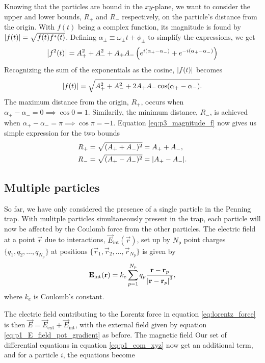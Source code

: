 Knowing that the particles are bound in the $xy$-plane, we want to consider the upper and lower bounds, $R_+$ and $R_-$ respectively, on the particle's distance from the origin. With $f(t)$ being a complex function, its magnitude is found by $\abs{f(t)}=\sqrt{f(t)f^*(t)}$. Defining $\alpha_\pm \equiv \omega_\pm t + \phi_\pm$ to simplify the expressions, we get 
\begin{equation}\label{eq:p3_magnitude_f_squared}
        \abs{f^2(t)} = A_+^2 + A_-^2 + A_+ A_- \left( e^{i(\alpha_+ - \alpha_-)} + e^{-i(\alpha_+ - \alpha_-)} \right)
\end{equation}
Recognizing the sum of the exponentials as the cosine, $\abs{f(t)}$ becomes 
\begin{equation}\label{eq:p3_magnitude_f}
    \abs{f(t)} = \sqrt{A_+^2 + A_-^2 + 2A_+ A_-\cos(\alpha_+ - \alpha_-)}.
\end{equation}
The maximum distance from the origin, $R_+$, occurs when $\alpha_+-\alpha_- = 0 \implies \cos0=1$. Similarily, the minimum distance, $R_-$, is achieved when $\alpha_+-\alpha_- = \pi \implies \cos\pi=-1$. Equation \eqref{eq:p3_magnitude_f} now gives us simple expression for the two bounds  
\begin{align}
    R_+ &= \sqrt{(A_+ + A_-)^2} = A_+ + A_-, \label{eq:p4_Rplus} \\
    R_- &= \sqrt{(A_+ - A_-)^2} = \abs{A_+ - A_-}. \label{eq:p4_Rminus}  
\end{align}


\subsection{Multiple particles}\label{subsec_methods:multiple_particles}
So far, we have only considered the presence of a single particle in the Penning trap. With mulitple particles simultaneously present in the trap, each particle will now be affected by the Coulomb force from the other particles. The electric field at a point $\vec{r}$ due to interactions, $\vec{E}_\mathrm{int}(\vec{r})$, set up by $N_\mathrm{p}$ point charges $\{q_1, q_2, \dots, q_{N_\mathrm{p}}\}$ at positions $\{\vec{r}_1, \vec{r}_2, \dots, \vec{r}_{N_\mathrm{p}}\}$ is given by
\begin{equation}\label{eq:interaction_field}
    \mathbf{E}_\mathrm{int} (\mathbf{r}) = k_e \sum_{p=1}^{N_\mathrm{p}} q_p \frac{\mathbf{r}-\mathbf{r}_p}{\abs{\mathbf{r}-\mathbf{r}_p}^3},
\end{equation}
where $k_e$ is Coulomb's constant. 

The electric field contributing to the Lorentz force in equation \eqref{eq:lorentz_force} is then $\vec{E} = \vec{E}_\mathrm{ext} + \vec{E}_\mathrm{int}$, with the external field given by equation \eqref{eq:p1_E_field_pot_gradient} as before. The magnetic field  Our set of differential equations in equation \eqref{eq:p1_eom_xyz} now get an additional term, and for a particle $i$, the equations become 

